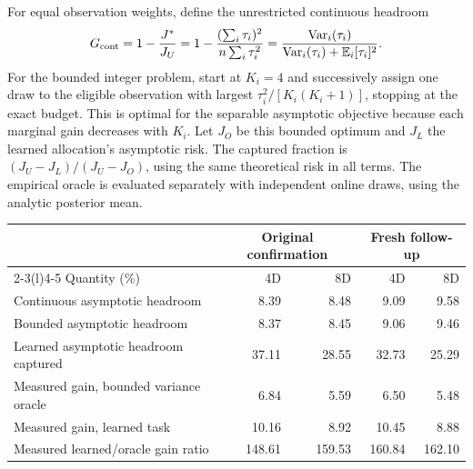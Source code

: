 \documentclass[11pt,letterpaper]{article}
\newcommand{\E}{\mathbb E}
\begin{document}
For equal observation weights, define the unrestricted continuous headroom
\begin{equation}
 G_{\rm cont}=1-\frac{J^*}{J_U}=1-\frac{(\sum_i\tau_i)^2}{n\sum_i\tau_i^2}
 =\frac{\operatorname{Var}_i(\tau_i)}{\operatorname{Var}_i(\tau_i)+\E_i[\tau_i]^2}.
\end{equation}
For the bounded integer problem, start at $K_i=4$ and successively assign one draw to the eligible observation with largest $\tau_i^2/[K_i(K_i+1)]$, stopping at the exact budget. This is optimal for the separable asymptotic objective because each marginal gain decreases with $K_i$. Let $J_O$ be this bounded optimum and $J_L$ the learned allocation's asymptotic risk. The captured fraction is $(J_U-J_L)/(J_U-J_O)$, using the same theoretical risk in all terms. The empirical oracle is evaluated separately with independent online draws, using the analytic posterior mean.
\begin{center}\small
\begin{tabular}{@{}lrrrr@{}}
\toprule
&\multicolumn{2}{c}{Original confirmation}&\multicolumn{2}{c}{Fresh follow-up}\\
\cmidrule(lr){2-3}\cmidrule(l){4-5}
Quantity (\%)&4D&8D&4D&8D\\
\midrule
Continuous asymptotic headroom&8.39&8.48&9.09&9.58\\
Bounded asymptotic headroom&8.37&8.45&9.06&9.46\\
Learned asymptotic headroom captured&37.11&28.55&32.73&25.29\\
Measured gain, bounded variance oracle&6.84&5.59&6.50&5.48\\
Measured gain, learned task&10.16&8.92&10.45&8.88\\
Measured learned/oracle gain ratio&148.61&159.53&160.84&162.10\\
\bottomrule
\end{tabular}
\label{tab:oracle}
\end{center}
\clearpage
\end{document}
